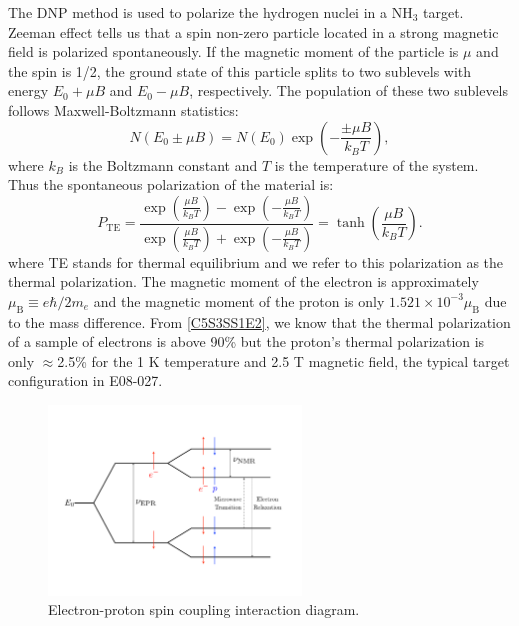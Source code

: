 The DNP method is used to polarize the hydrogen nuclei in a NH${}_3$ target. Zeeman effect tells us that a spin non-zero particle located in a strong magnetic field is polarized spontaneously. If the magnetic moment of the particle is $\mu$ and the spin is 1/2, the ground state of this particle splits to two sublevels with energy $E_0+\mu B$ and $E_0-\mu B$, respectively. The population of these two sublevels follows Maxwell-Boltzmann statistics:
\begin{equation} \label{C5S3SS1E1}
N(E_0\pm\mu B) = N(E_0)\exp(-\frac{\pm\mu B}{k_B T}),
\end{equation}
where $k_B$ is the Boltzmann constant and $T$ is the temperature of the system. Thus the spontaneous polarization of the material is:
\begin{equation} \label{C5S3SS1E2}
P_{\mathrm{TE}} = \frac{\exp(\frac{\mu B}{k_BT})-\exp(-\frac{\mu B}{k_BT})}{\exp(\frac{\mu B}{k_BT})+\exp(-\frac{\mu B}{k_BT})} = \tanh(\frac{\mu B}{k_B T}).
\end{equation}
where TE stands for thermal equilibrium and we refer to this polarization as the thermal polarization. The magnetic moment of the electron is approximately $\mu_{\mathrm{B}}\equiv e\hbar/2m_e$ and the magnetic moment of the proton is only $1.521\times10^{-3}\mu_{\mathrm{B}}$ due to the mass difference. From \cref{C5S3SS1E2}, we know that the thermal polarization of a sample of electrons is above 90\% but the proton's thermal polarization is only $\approx$2.5\% for the 1 K temperature and 2.5 T magnetic field, the typical target configuration in E08-027.

\begin{figure}[tb!]
  \centering
  \includegraphics[width=0.6\textwidth]{figs/DNP.pdf}
  \caption[Electron-proton spin coupling interaction diagram.]{Electron-proton spin coupling interaction diagram. \label{C5S3SS1F1}}
\end{figure}

